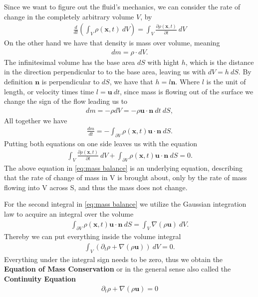 Since we want to figure out the fluid's mechanics, we can consider the rate
of change in the completely arbitrary volume $V$, by
\begin{align}
    \frac{d}{dt}\left( \int_V \rho(\mathbf{x}, t)\ dV \right) = \int_V
    \frac{\partial \rho(\mathbf{x}, t)}{\partial t} \ dV
\end{align}
On the other hand we have that density is mass over volume, meaning
\begin{align}
    dm = \rho \cdot dV.
\end{align}
The infinitesimal volume has the base area $dS$ with hight $h$, which is the
distance in the direction perpendicular to to the base area, leaving us with
$dV = h\ dS$. By definition $\mathbf{n}$ is perpendicular to $dS$, we have
that $h = l \mathbf{n}$. Where $l$ is the unit of length, or velocity times
time $l = \mathbf{u}\ dt$, since mass is flowing out of the surface we
change the sign of the flow leading us to
\begin{align}
   dm  = -\rho dV = -\rho \mathbf{u} \cdot \mathbf{n}\ dt\ dS,
\end{align}
All together we have
\begin{align}
    \frac{dm}{dt} = -\int_{\partial V} \rho(\mathbf{x},t)
    \mathbf{u}\cdot\mathbf{n}\ dS.
\end{align}
Putting both equations on one side leaves us with the equation
\begin{align}\label{eq:mass balance}
     \int_V \frac{\partial \rho(\mathbf{x}, t)}{\partial t}\ dV
    +\int_{\partial V} \rho(\mathbf{x}, t) \mathbf{u}\cdot\mathbf{n}\ dS
    = 0.
\end{align}
The above equation in \ref{eq:mass balance} is an underlying equation, describing that the rate of
change of mass in V is brought about, only by the rate of mass flowing into
V across S, and thus the mass does not change.

For the second integral in \ref{eq:mass balance} we utilize the Gaussian
integration law to acquire an integral over the volume
\begin{align}
    \int_{\partial V} \rho(\mathbf{x}, t) \mathbf{u} \cdot \mathbf{n} \ dS =
    \int_V \nabla (\rho \mathbf{u})\ dV.
\end{align}
Thereby we can put everything inside the volume integral
\begin{align}
    \int_V \left(\partial_t \rho + \nabla(\rho \mathbf{u}) \right) \ dV = 0.
\end{align}
Everything under the integral sign needs to be zero, thus we obtain
the \textbf{Equation of Mass Conservation} or in the general sense also
called the \textbf{Continuity Equation}
\begin{align}\label{eq:continuity}
    \partial_t \rho + \nabla(\rho \mathbf{u}) = 0
\end{align}


